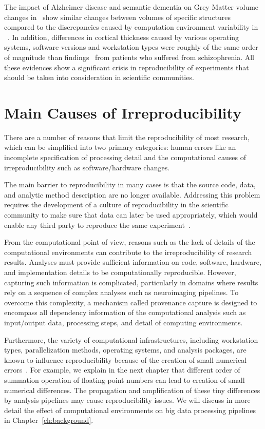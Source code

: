 The impact of Alzheimer disease and semantic dementia on Grey Matter volume changes in~\cite{lehmann2010atrophy}
show similar changes between volumes of specific structures
compared to the discrepancies caused by computation environment variability in ~\cite{Gronenschild2012}. 
In addition, differences in cortical thickness caused by various operating systems, software versions and 
workstation types were roughly of the same order of magnitude than 
findings~\cite{kuperberg2003regionally} from patients who suffered from schizophrenia.
All these evidences show a significant crisis in 
reproducibility of experiments that should be taken into consideration in 
scientific communities.

\section{Main Causes of Irreproducibility} 

There are a number of reasons that limit the reproducibility of most research,
which can be simplified into two primary categories: human errors like
an incomplete specification of processing detail and the computational
causes of irreproducibility such as software/hardware changes.

The main barrier to reproducibility in many cases is 
that the source code, data, and analytic method description are no longer 
available. Addressing this problem requires the development of a culture of 
reproducibility in the scientific community to make sure that data can later be used appropriately,
which would enable any third 
party to reproduce the same experiment~\cite{peng2011reproducible, 
stodden2016enhancing}. 

From the computational point of view, reasons such as the lack of 
details of the computational environments can contribute to the
irreproducibility of research results. Analyses must provide sufficient 
information on code, software, hardware, and implementation details to 
be computationally reproducible. However, capturing such 
information is complicated, particularly in domains where results rely 
on a sequence of complex analyses such as neuroimaging pipelines. 
To overcome this complexity, a mechanism called provenance capture is
designed to encompass all dependency information of the computational 
analysis such as input/output data, processing steps, and 
detail of computing environments. 

Furthermore, the variety of computational infrastructures, including 
workstation types, parallelization methods, operating systems, and 
analysis packages, are known to influence reproducibility because of the 
creation of small numerical errors~\cite{Gronenschild2012, 
diethelm2012limits, Glatard2015}. 
For example, we explain in the next chapter that different order of 
summation operation of floating-point numbers can lead to creation of 
small numerical differences. 
The propagation and amplification of these tiny
differences by analysis pipelines may cause reproducibility issues. We
will discuss in more detail the effect of computational environments
on big data processing pipelines in Chapter~\ref{ch:background}.

